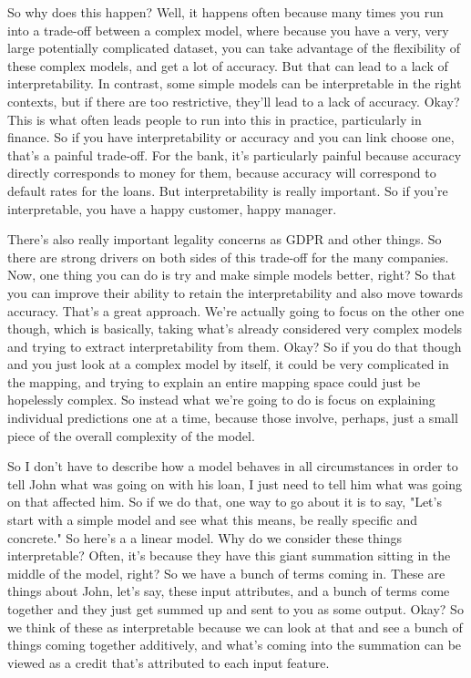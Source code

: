 \hspace*{3.5mm} So why does this happen? Well, it happens often because many times you run into a trade-off between a complex model, where because you have a very, very large potentially complicated dataset, you can take advantage of the flexibility of these complex models, and get a lot of accuracy. But that can lead to a lack of interpretability. In contrast, some simple models can be interpretable in the right contexts, but if there are too restrictive, they'll lead to a lack of accuracy.
Okay? This is what often leads people to run into this in practice, particularly in finance. So if you have interpretability or accuracy and you can link choose one, that's a painful trade-off. For the bank, it's particularly painful because accuracy directly corresponds to money for them, because accuracy will correspond to default rates for the loans. But interpretability is really important. So if you're interpretable, you have a happy customer, happy manager.

\hspace*{3.5mm} There's also really important legality concerns as GDPR and other things. So there are strong drivers on both sides of this trade-off for the many companies. Now, one thing you can do is try and make simple models better, right? So that you can improve their ability to retain the interpretability and also move towards accuracy. That's a great approach. We're actually going to focus on the other one though, which is basically, taking what's already considered very complex models and trying to extract interpretability from them. Okay? So if you do that though and you just look at a complex model by itself, it could be very complicated in the mapping, and trying to explain an entire mapping space could just be hopelessly complex. So instead what we're going to do is focus on explaining individual predictions one at a time, because those involve, perhaps, just a small piece of the overall complexity of the model. 

\hspace*{3.5mm} So I don't have to describe how a model behaves in all circumstances in order to tell John what was going on with his loan, I just need to tell him what was going on that affected him. So if we do that, one way to go about it is to say, "Let's start with a simple model and see what this means, be really specific and concrete." So here's a a linear model. Why do we consider these things interpretable? Often, it's because they have this giant summation sitting in the middle of the model, right? So we have a bunch of terms coming in. These are things about John, let's say, these input attributes, and a bunch of terms come together and they just get summed up and sent to you as some output. Okay? So we think of these as interpretable because we can look at that and see a bunch of things coming together additively, and what's coming into the summation can be viewed as a credit that's attributed to each input feature. 

